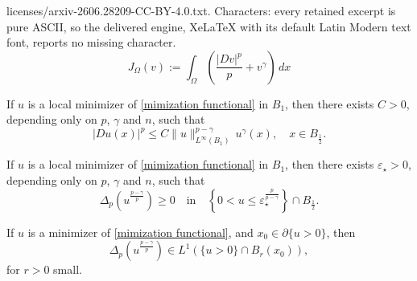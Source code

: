 \documentclass[10pt,a4paper]{amsart}
\begin{document}
licenses/arxiv-2606.28209-CC-BY-4.0.txt. Characters: every retained excerpt is pure ASCII, so the delivered engine, XeLaTeX with its default Latin Modern text font, reports no missing character.
\begin{equation}\label{mimization functional}
J_\Omega(v):=\int_{\Omega}\left(\frac{|Dv|^p}{p} + v^\gamma \right)\,dx
\end{equation}

\begin{theorem}\label{magic theorem}
If $u$ is a local minimizer of \eqref{mimization functional} in $B_1$, then there exists $C>0$, depending only on $p$, $\gamma$ and $n$, such that
$$
|Du(x)|^p\le C\|u\|_{L^\infty(B_1)}^{p-\gamma}\, u^{\gamma}(x),\quad x\in B_{\frac{1}{2}}.
$$
\end{theorem}

\begin{proposition}\label{subsol}
If $u$ is a local minimizer of \eqref{mimization functional} in $B_1$, then there exists $\varepsilon_\star>0$, depending only on $p$, $\gamma$ and $n$, such that 
$$
\Delta_p\left(u^{\frac{p-\gamma}{p}}\right)\ge0 \quad \mbox{in} \quad \left\{0<u\le\varepsilon_\star^{\frac{p}{p-\gamma}}\right\} \cap B_{\frac{1}{2}}.
$$
\end{proposition}

\begin{lemma}\label{integrability lemma}
    If $u$ is a minimizer of \eqref{mimization functional}, and $x_0\in\partial\{u>0\}$, then
    $$
    \Delta_p(u^{\frac{p-\gamma}{p}})\in L^1\left(\{u>0\}\cap B_r(x_0)\right),
    $$
    for $r>0$ small.
\end{lemma}
\end{document}
